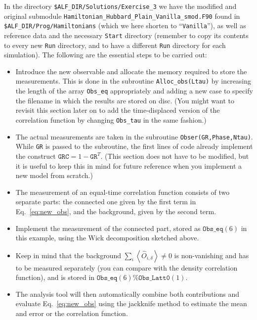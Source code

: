 \documentclass[10pt,modern]{scrartcl}
\numberwithin{exerciseitem}{exercise} %
\begin{document}
In the directory  \texttt{\$ALF\_DIR/Solutions/Exercise\_3} we have the modified and original submodule \texttt{Hamiltonian\_Hubbard\_Plain\_Vanilla\_smod.F90} found in \texttt{\$ALF\_DIR/Prog/Hamiltonians} (which we here shorten to ``\texttt{Vanilla}''), as well as reference data and the necessary \texttt{Start} directory (remember to copy its contents to every new \texttt{Run} directory, and to have a different \texttt{Run} directory for each simulation). The following are the essential steps to be carried out:
\begin{itemize}
	\item  Introduce the new observable and allocate the memory required to store the measurements. This is done in the subroutine \texttt{Alloc\_obs(Ltau)} by increasing the length of the array \texttt{Obs\_eq} appropriately and adding a new case to specify the filename in which the results are stored on disc. (You might want to revisit this section later on to add the time-displaced version of the correlation function by changing \texttt{Obs\_tau} in the same fashion.)
	\item  The actual measurements are taken in the subroutine \texttt{Obser(GR,Phase,Ntau)}. While \texttt{GR} is passed to the subroutine, the first lines of code already implement the construct $\mathtt{GRC}=1-\mathtt{GR}^T$. (This section does not have to be modified, but it is useful to keep this in mind for future reference when you implement a new model from scratch.)
	\item The measurement of an equal-time correlation function consists of two separate parts: the connected one given by the first term in Eq.~\ref{eq:new_obs}, and the background, given by the second term.
	\item Implement the measurement of the connected part, stored as $\mathtt{Obs\_eq}(6)$ in this example, using the Wick decomposition sketched above.
	\item Keep in mind that the background $\sum_i\left\langle \hat{O}_{i,\delta} \right\rangle\neq0$ is non-vanishing and has to be measured separately (you can compare with the density correlation function), and is stored in $\mathtt{Obs\_eq}(6)\%\mathtt{Obs\_Latt0}(1)$.
	\item The analysis tool will then automatically combine both contributions and evaluate Eq.~\ref{eq:new_obs} using the jackknife method to estimate the mean and error or the correlation function.
\end{itemize}
\end{document}
